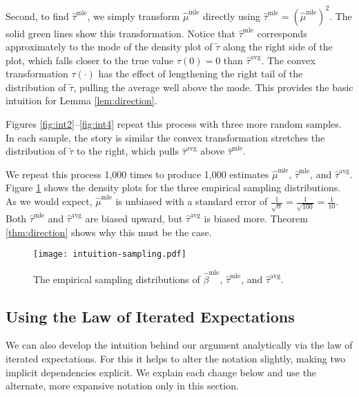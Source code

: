 \documentclass[11pt]{article}
\begin{document}
Second, to find $\hat{\tau}^\text{mle}$, we simply transform $\hat{\mu}^\text{mle}$ directly using $\hat{\tau}^\text{mle} = \left( \hat{\mu}^\text{mle} \right) ^2$.
The solid green lines show this transformation.
Notice that $\hat{\tau}^\text{mle}$ corresponds approximately to the mode of the density plot of $\tilde{\tau}$ along the right side of the plot, which falls closer to the true value $\tau(0) = 0$ than $\hat{\tau}^\text{avg}$.
The convex transformation $\tau(\cdot)$ has the effect of lengthening the right tail of the distribution of $\tilde{\tau}$, pulling the average well above the mode.
This provides the basic intuition for Lemma \ref{lem:direction}.

Figures \ref{fig:int2}--\ref{fig:int4} repeat this process with three more random samples.
In each sample, the story is similar \textemdash{} the convex transformation stretches the distribution of $\tilde{\tau}$ to the right, which pulls $\hat{\tau}^\text{avg}$ above $\hat{\tau}^\text{mle}$.

We repeat this process 1,000 times to produce 1,000 estimates $\hat{\mu}^\text{mle}$, $\hat{\tau}^\text{mle}$, and $\hat{\tau}^\text{avg}$.
Figure \ref{fig:int-samp} shows the density plots for the three empirical sampling distributions.
As we would expect, $\hat{\mu}^\text{mle}$ is unbiased with a standard error of $\frac{1}{\sqrt{n}} = \frac{1}{\sqrt{100}} = \frac{1}{10}$.
Both $\hat{\tau}^\text{mle}$ and $\hat{\tau}^\text{avg}$ are biased upward, but $\hat{\tau}^\text{avg}$ is biased more.
Theorem \ref{thm:direction} shows why this must be the case.

\begin{figure}[h]
\begin{center}
\texttt{[image: intuition-sampling.pdf]}\\
\vspace{.1in}
\caption{The empirical sampling distributions of $\hat{\beta}^\text{mle}$, $\hat{\tau}^\text{mle}$, and $\hat{\tau}^\text{avg}$.}\label{fig:int-samp}
\end{center}
\end{figure}


\subsection*{Using the Law of Iterated Expectations}

We can also develop the intuition behind our argument analytically via the law of iterated expectations. For this it helps to alter the notation slightly, making two implicit dependencies explicit. We explain each change below and use the alternate, more expansive notation only in this section.
\end{document}
